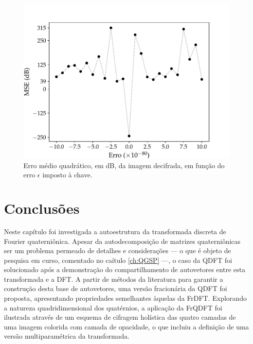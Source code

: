 

\begin{figure}
	\centering
	\includegraphics[width=0.7\linewidth]{Figures/MSEdb_FrQDFT_PT.pdf}
	\caption{Erro m\'edio quadr\'atico, em dB, da imagem decifrada, em fun\c c\~ao do erro $ \epsilon $ imposto \`a chave.}
	\label{fig:MSE}
\end{figure}

\section{Conclus\~oes}
\label{sec:conclusao}
Neste cap\'itulo foi investigada a autoestrutura da transformada discreta de Fourier quaterni\^onica. Apesar da autodecomposi\c c\~ao de matrizes quaterni\^onicas ser um problema permeado de detalhes e considera\c c\~oes --- o que \'e objeto de pesquisa em curso, comentado no ca\'itulo \ref{ch:QGSP} ---, o caso da QDFT foi solucionado ap\'os a demonstra\c c\~ao do com\-par\-ti\-lha\-men\-to de autovetores entre esta transformada e a DFT. A partir de m\'etodos da literatura para garantir a constru\c c\~ao desta base de autovetores, uma vers\~ao fracion\'aria da QDFT foi proposta, apresentando propriedades semelhantes \`aquelas da FrDFT. Explorando a natureza quadridimensional dos quat\'ernios, a aplica\c c\~ao da FrQDFT foi ilustrada atrav\'es de um esquema de cifragem hol\'istica das quatro camadas de uma imagem colorida com camada de opacidade, o que incluiu a defini\c c\~ao de uma vers\~ao multiparam\'etrica da transformada.


